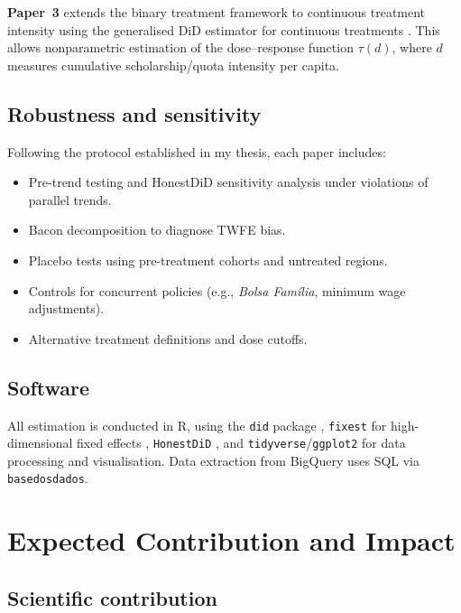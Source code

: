\documentclass[a4paper,11pt]{article}
\begin{document}
\textbf{Paper~3} extends the binary treatment framework to continuous treatment intensity using the generalised DiD estimator for continuous treatments \citep{callaway2024}. This allows nonparametric estimation of the dose--response function $\tau(d)$, where $d$ measures cumulative scholarship/quota intensity per capita.

\subsection{Robustness and sensitivity}

Following the protocol established in my thesis, each paper includes:
\begin{itemize}[nosep]
    \item Pre-trend testing and HonestDiD sensitivity analysis \citep{rambachan2023} under violations of parallel trends.
    \item Bacon decomposition \citep{goodmanbacon2021} to diagnose TWFE bias.
    \item Placebo tests using pre-treatment cohorts and untreated regions.
    \item Controls for concurrent policies (e.g., \textit{Bolsa Fam\'ilia}, minimum wage adjustments).
    \item Alternative treatment definitions and dose cutoffs.
\end{itemize}

\subsection{Software}

All estimation is conducted in R, using the \texttt{did} package \citep{callaway2021}, \texttt{fixest} for high-dimensional fixed effects \citep{berge2018}, \texttt{HonestDiD} \citep{rambachan2023}, and \texttt{tidyverse}/\texttt{ggplot2} for data processing and visualisation. Data extraction from BigQuery uses SQL via \texttt{basedosdados}.

\section{Expected Contribution and Impact}

\subsection{Scientific contribution}
\end{document}
